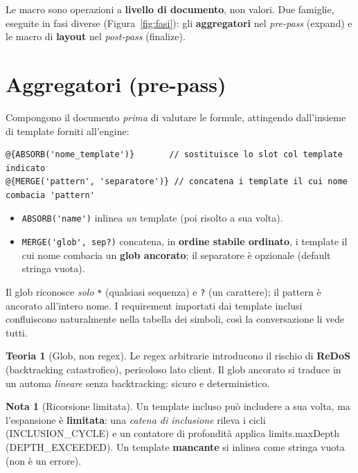 \documentclass[11pt,a4paper]{book}
\let\code\lstinline
\newcommand{\ic}[1]{{\ttfamily #1}}
\theoremstyle{definition}
\newtheorem*{nota}{Nota}
\newtheorem*{teoria}{Teoria}
\begin{document}
{{{{Le macro sono operazioni a \textbf{livello di documento}, non valori. Due famiglie,
eseguite in fasi diverse (Figura~\ref{fig:fasi}): gli \textbf{aggregatori} nel
\emph{pre-pass} (\ic{expand}) e le macro di \textbf{layout} nel \emph{post-pass}
(\ic{finalize}).

\section{Aggregatori (pre-pass)}

Compongono il documento \emph{prima} di valutare le formule, attingendo
dall'insieme di template forniti all'engine:

\begin{lstlisting}
@{ABSORB('nome_template')}       // sostituisce lo slot col template indicato
@{MERGE('pattern', 'separatore')} // concatena i template il cui nome combacia 'pattern'
\end{lstlisting}

\begin{itemize}
  \item \code|ABSORB('name')| inlinea \emph{un} template (poi risolto a sua volta).
  \item \code|MERGE('glob', sep?)| concatena, in \textbf{ordine stabile ordinato},
    i template il cui nome combacia un \textbf{glob ancorato}; il separatore è
    opzionale (default stringa vuota).
\end{itemize}

Il glob riconosce \emph{solo} \code|*| (qualsiasi sequenza) e \code|?| (un
carattere); il pattern è ancorato all'intero nome. I requirement importati dai
template inclusi confluiscono naturalmente nella tabella dei simboli, così la
conversazione li vede tutti.

\begin{teoria}[Glob, non regex]
Le regex arbitrarie introducono il rischio di \textbf{ReDoS} (backtracking
catastrofico), pericoloso lato client. Il glob ancorato si traduce in un automa
\emph{lineare} senza backtracking: sicuro e deterministico.
\end{teoria}

\begin{nota}[Ricorsione limitata]
Un template incluso può includere a sua volta, ma l'espansione è \textbf{limitata}:
una \emph{catena di inclusione} rileva i cicli (\ic{INCLUSION\_CYCLE}) e un
contatore di profondità applica \ic{limits.maxDepth} (\ic{DEPTH\_EXCEEDED}). Un
template \textbf{mancante} si inlinea come stringa vuota (non è un errore).
\end{nota}

}}}}
\end{document}
